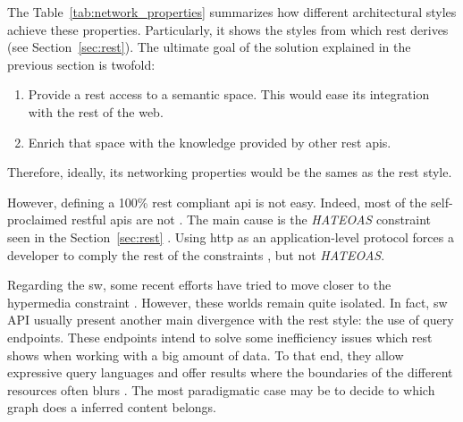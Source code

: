 The Table~\ref{tab:network_properties} summarizes how different architectural styles achieve these properties.
Particularly, it shows the styles from which \ac{rest} derives (see Section~\ref{sec:rest}).
The ultimate goal of the solution explained in the previous section is twofold:
\begin{enumerate}
  \item Provide a \ac{rest} access to a semantic space.
       This would ease its integration with the rest of the web.
  \item Enrich that space with the knowledge provided by other \ac{rest} \acp{api}.
\end{enumerate}
Therefore, ideally, its networking properties would be the sames as the \ac{rest} style.


However, defining a 100\% \ac{rest} compliant \ac{api} is not easy.
Indeed, most of the self-proclaimed \ac{rest}ful \acp{api} are not \citep{house_how_2012}. %
The main cause is the \emph{HATEOAS} constraint seen in the Section~\ref{sec:rest} \citep{fielding_rest_2008}.
Using \ac{http} as an application-level protocol forces a developer to comply the rest of the constraints \citet{moore_hypermedia_2010}, but not \emph{HATEOAS}.


Regarding the \ac{sw}, some recent efforts have tried to move closer to the \ac{hypermedia} constraint \citep{steiner_fulfilling_2011,kjernsmo_necessity_2012}.
However, these worlds remain quite isolated.
In fact, \ac{sw} API  usually present another main divergence with the \ac{rest} style: the use of query endpoints.
These endpoints intend to solve some inefficiency issues which \ac{rest} shows when working with a big amount of data. %
To that end, they allow expressive query languages and offer results where the boundaries of the different resources often blurs \citep{wilde_restful_2009}.
The most paradigmatic case may be to decide to which graph does a inferred content belongs. %



